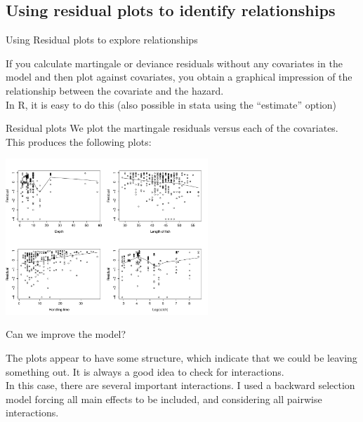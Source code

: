 \documentclass[envcountsect, 10pt, portrait, palatino]{beamer}
\begin{document}
\subsection{Using residual plots to identify relationships}
\begin{frame}{Using Residual plots to explore relationships}

If you calculate martingale or deviance residuals
without any covariates in the model and then plot
against covariates, you obtain a graphical impression of the
relationship between the covariate and the hazard.
\\[2ex]
In R, it is easy to do this (also possible in stata using the
``estimate'' option)
\end{frame}
\begin{frame}{Residual plots}
We plot the martingale residuals versus each of the covariates. This produces the following plots:
\centerline{\includegraphics[width=3in]{res_plots.pdf}}
\end{frame}
\begin{frame}{Can we improve the model?}

The plots appear to have some structure, which indicate that
we could be leaving something out.  It is always a good idea
to check for interactions.
\\[2ex]
In this case, there are several important interactions. 
I used a backward selection model forcing all main effects to be included,
and considering all pairwise interactions. 
\end{frame}
\end{document}
